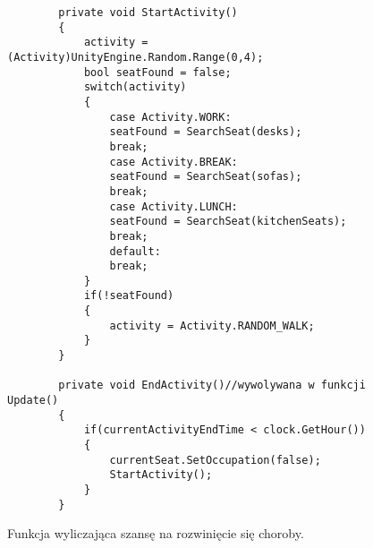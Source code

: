 \begin{figure}
	\begin{lstlisting}
		private void StartActivity()
		{
			activity = (Activity)UnityEngine.Random.Range(0,4);
			bool seatFound = false;
			switch(activity)
			{
				case Activity.WORK:
				seatFound = SearchSeat(desks);
				break;
				case Activity.BREAK:
				seatFound = SearchSeat(sofas);
				break;
				case Activity.LUNCH:
				seatFound = SearchSeat(kitchenSeats);
				break;
				default:
				break;
			}
			if(!seatFound)
			{
				activity = Activity.RANDOM_WALK;
			}
		}
		
		private void EndActivity()//wywolywana w funkcji Update()
		{
			if(currentActivityEndTime < clock.GetHour())
			{
				currentSeat.SetOccupation(false);
				StartActivity();
			}
		}
	\end{lstlisting}
	\caption{Funkcja wyliczająca szansę na rozwinięcie się choroby.}
\end{figure}



